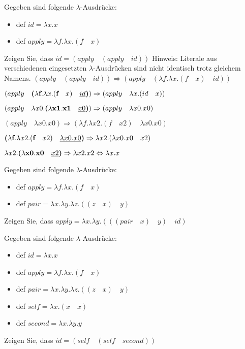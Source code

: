 \begin{card}
	Gegeben sind folgende $\lambda$-Ausdrücke:
	\begin{itemize}
	\item def $id = \lambda x.x$
	\item def $apply = \lambda f. \lambda x.(f \quad x)$
	\end{itemize}
	Zeigen Sie, dass $id = (apply \quad (apply \quad id))$
	\hr
	Hinweis: Literale aus verschiedenen eingesetzten $\lambda$-Ausdrücken sind nicht identisch trotz gleichem Namens.
	$(apply \quad (apply \quad id)) \Rightarrow (apply \quad (\lambda f. \lambda x.(f \quad x) \quad id))$
	
	$(apply \quad \textbf{(}\lambda \textbf{f}. \lambda x.(\textbf{f} \quad x) \quad \uline{id}\textbf{)}) \Rightarrow 
	(apply \quad \lambda x.(id \quad x))$
	
	$(apply \quad \lambda x0.\textbf{(} \lambda \textbf{x1} . \textbf{x1} \quad \uline{x0} \textbf{)}) \Rightarrow 
	(apply \quad \lambda x0.x0)$
	
	$(apply \quad \lambda x0.x0) \Rightarrow (\lambda f. \lambda x2.(f \quad x2) \quad \lambda x0.x0)$
	
	$\textbf{(}\lambda \textbf{f}. \lambda x2.(\textbf{f} \quad x2) \quad \uline{\lambda x0.x0} \textbf{)} \Rightarrow
	\lambda x2.(\lambda x0.x0 \quad x2)$
	
	$\lambda x2.\textbf{(}\lambda \textbf{x0}.\textbf{x0} \quad \uline{x2} \textbf{)} \Rightarrow
	\lambda x2.x2 \Leftrightarrow \lambda x.x$
\end{card}

\begin{card}
	Gegeben sind folgende $\lambda$-Ausdrücke:
	\begin{itemize}
	\item def $apply = \lambda f. \lambda x.(f \quad x)$
	\item def $pair = \lambda x. \lambda y. \lambda z.((z \quad x ) \quad y)$
	\end{itemize}
	Zeigen Sie, dass $apply = \lambda x.\lambda y.(((pair \quad x) \quad y) \quad id)$
	\hr
\end{card}

\begin{card}
	Gegeben sind folgende $\lambda$-Ausdrücke:
	\begin{itemize}
	\item def $id = \lambda x.x$
	\item def $apply = \lambda f. \lambda x.(f \quad x)$
	\item def $pair = \lambda x. \lambda y. \lambda z.((z \quad x ) \quad y)$
	\item def $self = \lambda x.(x \quad x)$
	\item def $second = \lambda x.\lambda y. y$
	\end{itemize}
	Zeigen Sie, dass $id = (self \quad (self \quad second))$
	\hr
\end{card}

